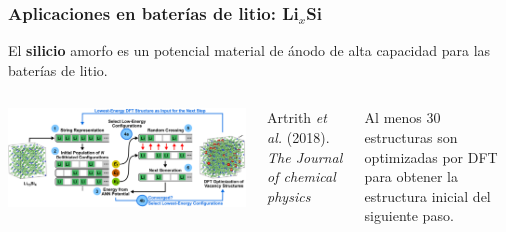 \documentclass[aspectratio=169]{beamer}
\let\oldtextbf\textbf
\renewcommand{\textbf}[1]{\textcolor{nordblue}{\oldtextbf{#1}}}
\begin{document}
    \begin{frame}
        \frametitle{Aplicaciones en baterías de litio: Li$_x$Si}
        
        El \textbf{silicio} amorfo es un potencial material de ánodo de alta
        capacidad para las baterías de litio.
        
        \begin{columns}
            \begin{center}
                \includegraphics[width=\columnwidth]{LiSi-metodo.png}
            \end{center}
            \tiny{Artrith \textit{et al.} (2018). \textit{The Journal of chemical
            physics}}

            Al menos 30 estructuras son optimizadas por DFT para obtener la 
            estructura inicial del siguiente paso.
        \end{columns}
            
    \end{frame}
    
\end{document}
